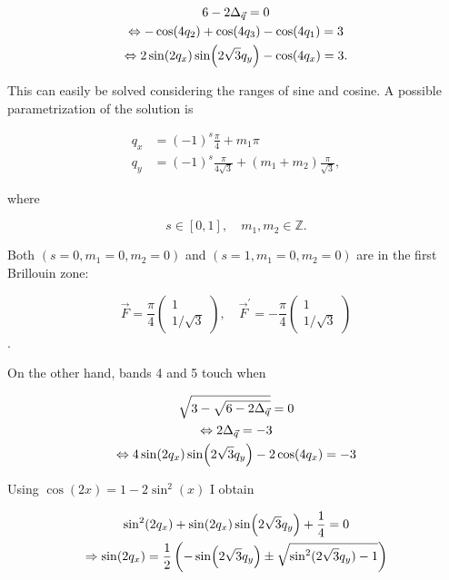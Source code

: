 \documentclass[../../../main.tex]{subfiles}
\begin{document}
\begin{gather}
	6-2\Delta_{\vec{q}} = 0 \notag \\
	\Leftrightarrow -\cos(4q_2)+\cos(4q_3)-\cos(4q_1) = 3 \notag \\
	\Leftrightarrow 2\sin(2q_x)\sin(2\sqrt{3}q_y) - \cos(4q_x) = 3.
\end{gather}

This can easily be solved considering the ranges of sine and cosine. A possible parametrization of the solution is 

\begin{align}
	q_x &= (-1)^s \frac{\pi}{4} + m_1 \pi \\
	q_y &= (-1)^s \frac{\pi}{4\sqrt{3}} +(m_1 + m_2)\frac{\pi}{\sqrt{3}},
\end{align}

where

\begin{equation*}
	s \in [0,1], \quad m_1, m_2 \in \mathbb{Z}.
\end{equation*}

Both $(s = 0, m_1 = 0, m_2 = 0)$ and $(s = 1, m_1 = 0, m_2 = 0)$ are in the first Brillouin zone:

\begin{equation}
	\vec{F} = \frac{\pi}{4}
	\begin{pmatrix}
		1 \\
		1/\sqrt{3}
	\end{pmatrix}, \quad 
	\vec{F}^\prime = -\frac{\pi}{4}
	\begin{pmatrix}
		1 \\
		1/\sqrt{3}
	\end{pmatrix}
\end{equation}.

On the other hand, bands 4 and 5 touch when 

\begin{gather}
	\sqrt{3-\sqrt{6-2\Delta_{\vec{q}}}} = 0 \notag \\
	\Leftrightarrow 2\Delta_{\vec{q}} = -3 \\
	\Leftrightarrow 4\sin(2q_x)\sin(2\sqrt{3}q_y) - 2\cos(4q_x) = -3 \notag
\end{gather}

Using $\cos(2x) = 1-2\sin^2(x)$ I obtain

\begin{gather}
	\sin^2(2q_x) + \sin(2q_x)\sin(2\sqrt{3}q_y) + \frac14 = 0 \notag \\
	\Rightarrow \sin(2q_x) = \frac12\left( -\sin(2\sqrt{3}q_y) \pm \sqrt{\sin^2(2\sqrt{3}q_y) - 1}\right)
\end{gather}
\end{document}
